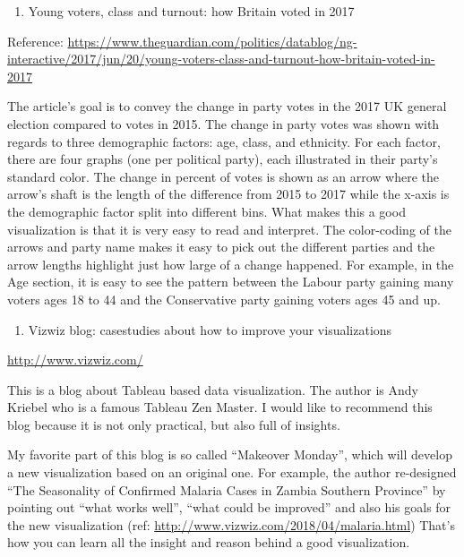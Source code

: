 \documentclass[]{book}
\providecommand{\tightlist}{%
  \setlength{\itemsep}{0pt}\setlength{\parskip}{0pt}}
\theoremstyle{definition}
\theoremstyle{definition}
\theoremstyle{definition}
\theoremstyle{remark}
\begin{document}
\citep{outliar}

\begin{enumerate}
\def\labelenumi{\arabic{enumi}.}
\setcounter{enumi}{7}
\tightlist
\item
  Young voters, class and turnout: how Britain voted in 2017
\end{enumerate}

Reference:
\url{https://www.theguardian.com/politics/datablog/ng-interactive/2017/jun/20/young-voters-class-and-turnout-how-britain-voted-in-2017}

The article's goal is to convey the change in party votes in the 2017 UK
general election compared to votes in 2015. The change in party votes
was shown with regards to three demographic factors: age, class, and
ethnicity. For each factor, there are four graphs (one per political
party), each illustrated in their party's standard color. The change in
percent of votes is shown as an arrow where the arrow's shaft is the
length of the difference from 2015 to 2017 while the x-axis is the
demographic factor split into different bins. What makes this a good
visualization is that it is very easy to read and interpret. The
color-coding of the arrows and party name makes it easy to pick out the
different parties and the arrow lengths highlight just how large of a
change happened. For example, in the Age section, it is easy to see the
pattern between the Labour party gaining many voters ages 18 to 44 and
the Conservative party gaining voters ages 45 and up.

\begin{enumerate}
\def\labelenumi{\arabic{enumi}.}
\setcounter{enumi}{7}
\tightlist
\item
  Vizwiz blog: casestudies about how to improve your visualizations
\end{enumerate}

\url{http://www.vizwiz.com/}

This is a blog about Tableau based data visualization. The author is
Andy Kriebel who is a famous Tableau Zen Master. I would like to
recommend this blog because it is not only practical, but also full of
insights.

My favorite part of this blog is so called ``Makeover Monday'', which
will develop a new visualization based on an original one. For example,
the author re-designed ``The Seasonality of Confirmed Malaria Cases in
Zambia Southern Province'' by pointing out ``what works well'', ``what
could be improved'' and also his goals for the new visualization (ref:
\url{http://www.vizwiz.com/2018/04/malaria.html}) That's how you can
learn all the insight and reason behind a good visualization.
\end{document}
